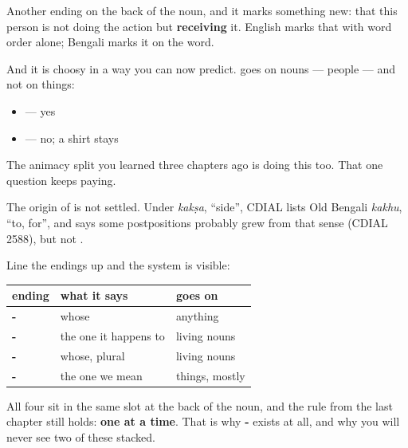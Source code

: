 Another ending on the back of the noun, and it marks something new: that this person is not doing the action but \textbf{receiving} it. English marks that with word order alone; Bengali marks it on the word.

And it is choosy in a way you can now predict. \textbf{} goes on \textbf{} nouns — people — and not on things:

\begin{itemize}
\raggedright
  \item \textbf{} — yes
  \item \textbf{} — no; a shirt stays \textbf{}
\end{itemize}

The animacy split you learned three chapters ago is doing this too. That one question keeps paying.

\begin{cousinweb}
The origin of \textbf{} is not settled. Under \emph{kakṣa}, \textquotedblleft{}side\textquotedblright{}, CDIAL lists Old Bengali \emph{kakhu}, \textquotedblleft{}to, for\textquotedblright{}, and says some postpositions probably grew from that sense (CDIAL 2588), but not \textbf{}.
\end{cousinweb}

\begin{grammarlens}[title={Grammar Lens: the same slot, still one at a time}]
Line the endings up and the system is visible:

\noindent
\begin{tabularx}{\linewidth}{@{}>{\raggedright\arraybackslash}X>{\raggedright\arraybackslash}X>{\raggedright\arraybackslash}X@{}}
\toprule
\textbf{ending} & \textbf{what it says} & \textbf{goes on} \\
\midrule
\textbf{-\bn{র}} & whose & anything \\
\textbf{-\bn{কে}} & the one it happens to & living nouns \\
\textbf{-\bn{দের}} & whose, plural & living nouns \\
\textbf{-\bn{টা}} & the one we mean & things, mostly \\
\bottomrule
\end{tabularx}

All four sit in the same slot at the back of the noun, and the rule from the last chapter still holds: \textbf{one at a time}. That is why \textbf{-} exists at all, and why you will never see two of these stacked.
\end{grammarlens}

